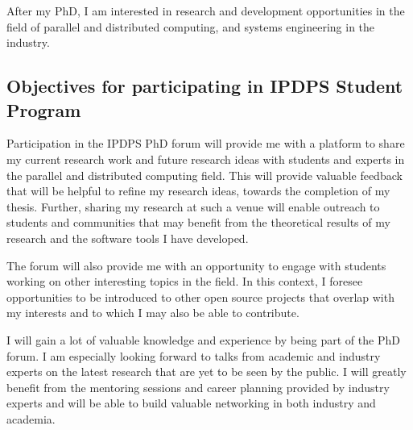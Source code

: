 After my PhD, I am interested in research and development opportunities in
the field of parallel and distributed computing, and systems engineering in
the industry.

\subsection{Objectives for participating in IPDPS Student Program}

Participation in the IPDPS PhD forum will provide me with a platform to share
my current research work and future research ideas with students and experts
in the parallel and distributed computing field. This will provide valuable
feedback that will be helpful to refine my research ideas, towards the
completion of my thesis. Further, sharing my research at such a venue will
enable outreach to students and communities that may benefit from the
theoretical results of my research and the software tools I have developed.

The forum will also provide me with an opportunity to engage with students
working on other interesting topics in the field. In this context, I foresee
opportunities to be introduced to other open source projects that overlap
with my interests and to which I may also be able to contribute.

I will gain a lot of valuable knowledge and experience by being part of the PhD 
forum. I am especially looking forward to talks from academic and industry 
experts on the latest research that are yet to be seen by the public. I will 
greatly benefit from the mentoring sessions and career planning provided by 
industry experts and will be able to build valuable networking in both industry 
and academia.


